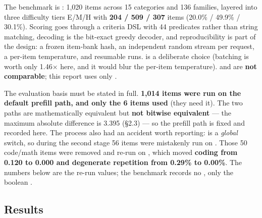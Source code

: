 \documentclass[11pt,openany]{article}
\begin{document}
The benchmark is : 1{,}020 items across 15 categories and 136 families, layered
into three difficulty tiers E/M/H with \textbf{204 / 509 / 307} items (20.0\% / 49.9\% / 30.1\%).
Scoring goes through a criteria DSL with 44 predicates rather than string matching, decoding is
the bit-exact greedy decoder, and reproducibility is part of the design: a frozen item-bank hash,
an independent random stream per request, a per-item temperature, and resumable runs.
\textbf{} is a deliberate choice (batching is worth only 1.46$\times$ here, and it
would blur the per-item temperature).  and  are \textbf{not comparable};
this report uses only .

The evaluation basis must be stated in full. \textbf{1{,}014 items were run on the default
 prefill path, and only the 6  items used } (they
need it). The two paths are mathematically equivalent but \textbf{not bitwise equivalent} --- the
maximum absolute difference is 3.395 (\S2.3) --- so the prefill path is fixed and recorded here.
The process also had an accident worth reporting: \linebreak[0] is a \emph{global} switch,
so during the second stage 56 items were mistakenly run on . Those 50 code/math
items were removed and re-run on , which moved \textbf{coding from 0.120 to 0.000
and degenerate repetition from 0.29\% to 0.00\%}. The numbers below are the re-run values; the
benchmark records no , only the boolean .

\subsection{Results}
\end{document}
